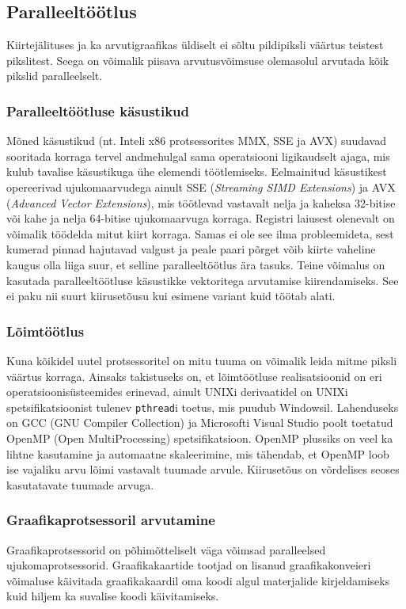 \documentclass[a4paper,12pt]{report}
\begin{document}
\subsection{Paralleeltöötlus}
Kiirtejälituses ja ka arvutigraafikas üldiselt ei sõltu pildipiksli
väärtus teistest pikslitest. Seega on võimalik piisava arvutusvõimsuse
olemasolul arvutada kõik pikslid paralleelselt.

\subsubsection{Paralleeltöötluse käsustikud}
Mõned käsustikud (nt. Inteli x86 protsessorites MMX, SSE ja AVX) suudavad
sooritada korraga tervel andmehulgal sama operatsiooni ligikaudselt ajaga,
mis kulub tavalise käsustikuga ühe elemendi töötlemiseks. Eelmainitud
käsustikest opereerivad ujukomaarvudega ainult SSE (\textit{Streaming
SIMD Extensions}) ja AVX (\textit{Advanced Vector Extensions}), mis 
töötlevad vastavalt nelja ja kaheksa 32-bitise või kahe ja nelja 64-bitise
ujukomaarvuga korraga. Registri laiusest olenevalt on võimalik töödelda
mitut kiirt korraga. Samas ei ole see ilma probleemideta, sest kumerad
pinnad hajutavad valgust ja peale paari põrget võib kiirte vaheline kaugus
olla liiga suur, et selline paralleeltöötlus ära tasuks. Teine võimalus
on kasutada paralleeltöötluse käsustikke vektoritega arvutamise kiirendamiseks.
See ei paku nii suurt kiirusetõusu kui esimene variant kuid töötab alati.

\subsubsection{Lõimtöötlus}
Kuna kõikidel uutel protsessoritel on mitu tuuma on võimalik leida mitme
piksli väärtus korraga. Ainsaks takistuseks on, et lõimtöötluse realisatsioonid
on eri operatsioonisüsteemides erinevad, ainult UNIXi derivaatidel on
UNIXi spetsifikatsioonist tulenev \texttt{pthread}i toetus, mis puudub
Windowsil. Lahenduseks on GCC (GNU Compiler Collection) ja Microsofti
Visual Studio poolt toetatud OpenMP (Open MultiProcessing) spetsifikatsioon.
OpenMP plussiks on veel ka lihtne kasutamine ja automaatne skaleerimine,
mis tähendab, et OpenMP loob ise vajaliku arvu lõimi vastavalt tuumade
arvule. Kiirusetõus on võrdelises seoses kasutatavate tuumade arvuga.

\subsubsection{Graafikaprotsessoril arvutamine}
Graafikaprotsessorid on põhimõtteliselt väga võimsad paralleelsed
ujukomaprotsessorid. Graafikakaartide tootjad on lisanud graafikakonveieri
võimaluse käivitada graafikakaardil oma koodi algul materjalide kirjeldamiseks
kuid hiljem ka suvalise koodi käivitamiseks.
\end{document}
